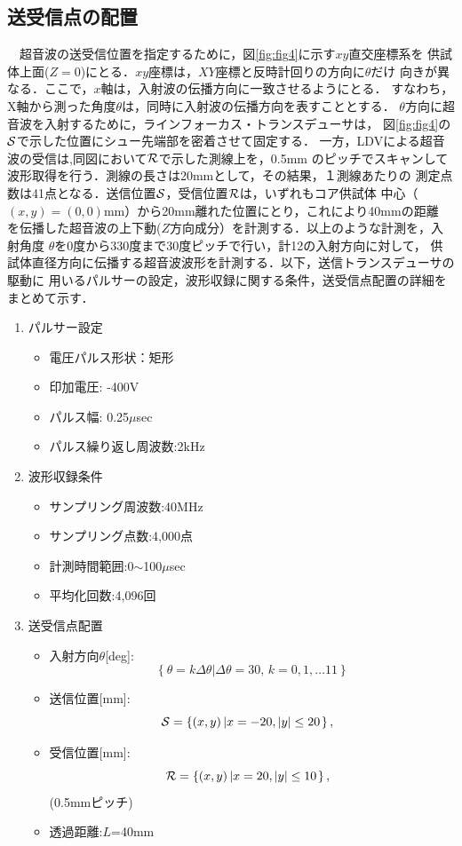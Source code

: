\subsection{送受信点の配置}
　超音波の送受信位置を指定するために，図\ref{fig:fig4}に示す$xy$直交座標系を
供試体上面($Z=0$)にとる．$xy$座標は，$XY$座標と反時計回りの方向に$\theta$だけ
向きが異なる．ここで，$x$軸は，入射波の伝播方向に一致させるようにとる．
すなわち，X軸から測った角度$\theta$は，同時に入射波の伝播方向を表すこととする．
$\theta$方向に超音波を入射するために，ラインフォーカス・トランスデューサは，
図\ref{fig:fig4}の$\cal S$で示した位置にシュー先端部を密着させて固定する．
一方，LDVによる超音波の受信は,同図において${\cal R}$で示した測線上を，0.5mm
のピッチでスキャンして波形取得を行う．測線の長さは20mmとして，その結果，１測線あたりの
測定点数は41点となる．送信位置$\cal S$，受信位置$\cal R$は，いずれもコア供試体
中心（$(x,y)=(0,0)$mm）から20mm離れた位置にとり，これにより40mmの距離
を伝播した超音波の上下動($Z$方向成分）を計測する．以上のような計測を，入射角度
$\theta$を0度から330度まで30度ピッチで行い，計12の入射方向に対して，
供試体直径方向に伝播する超音波波形を計測する．以下，送信トランスデューサの駆動に
用いるパルサーの設定，波形収録に関する条件，送受信点配置の詳細をまとめて示す．
\begin{enumerate}
\item パルサー設定
	\begin{itemize}
		\item 電圧パルス形状：矩形
		\item 印加電圧: -400V
		\item パルス幅: 0.25$\mu$sec 
		\item パルス繰り返し周波数:2kHz
	\end{itemize}
\item 波形収録条件
	\begin{itemize}
		\item サンプリング周波数:40MHz
		\item サンプリング点数:4,000点
		\item 計測時間範囲:0$\sim$100$\mu$sec
		\item 平均化回数:4,096回
	\end{itemize}
\item 送受信点配置
	\begin{itemize}
		\item 入射方向$\theta$[deg]:
	\[		
				\left\{ 
				\theta=k \Delta \theta \left| \Delta \theta=30,\, k=0,1,\dots 11\right.
				\right\}
			\]
		\item 送信位置[mm]:
			\[
				{\cal S}=\left\{ (x,y)\left| x=-20, |y| \leq 20\right.\right\}, \ \ 
			\]
		\item 受信位置[mm]:
			\[
				{\cal R}=\left\{ (x,y)\left| x=20,  |y| \leq 10\right.\right\}, \ \ 
			\](0.5mmピッチ)
		\item 透過距離:$L$=40mm
	\end{itemize}
\end{enumerate}
